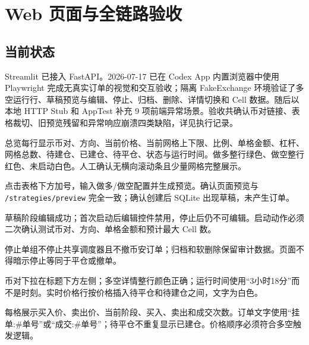 \section{Web 页面与全链路验收}

\subsection{当前状态}

Streamlit 已接入 FastAPI。2026-07-17 已在 Codex App 内置浏览器中使用 Playwright 完成无真实订单的视觉和交互验收；隔离 FakeExchange 环境验证了多空运行行、草稿预览与编辑、停止、归档、删除、详情切换和 Cell 数据。随后以本地 HTTP Stub 和 AppTest 补充 9 项前端异常场景。验收共确认币对链接、表格裁切、旧预览残留和异常响应崩溃四类缺陷，详见执行记录。


总览每行显示币对、方向、当前价格、当前网格上下限、比例、单格金额、杠杆、网格总数、待建仓、已建仓、待平仓、状态与运行时间。做多整行绿色、做空整行红色、未启动白色。人工确认无横向滚动条且少量网格完整展示。


点击表格下方加号，输入做多/做空配置并生成预览。确认页面预览与 \texttt{/strategies/preview} 完全一致；确认创建后 SQLite 出现草稿，未产生订单。


草稿阶段编辑成功；首次启动后编辑控件禁用，停止后仍不可编辑。启动动作必须二次确认测试币对、方向、单格金额和预计最大 Cell 数。


停止单组不停止共享调度器且不撤币安订单；归档和软删除保留审计数据。页面不得暗示停止等同于平仓或撤单。


币对下拉在标题下方左侧；多空详情整行颜色正确；运行时间使用“3小时18分”而不是时刻。实时价格行按价格插入待平仓和待建仓之间，文字为白色。


每格展示买入价、卖出价、当前阶段、买入、卖出和成交次数。订单文字使用“挂单:\#单号”或“成交:\#单号”；待平仓不重复显示已建仓。价格顺序必须符合多空触发逻辑。

